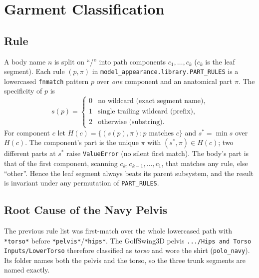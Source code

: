 \section{Garment Classification}
\label{sec:garment-classification}

\subsection{Rule}
A body name $n$ is split on ``/'' into path components $c_1, \dots, c_k$
($c_k$ is the leaf segment). Each rule $(p, \pi)$ in
\texttt{model\_appearance.library.PART\_RULES} is a lowercased \texttt{fnmatch}
pattern $p$ over \emph{one} component and an anatomical part $\pi$. The
specificity of $p$ is
\[
  s(p) = \begin{cases}
    0 & \text{no wildcard (exact segment name)},\\
    1 & \text{single trailing wildcard (prefix)},\\
    2 & \text{otherwise (substring)}.
  \end{cases}
\]
For component $c$ let $H(c) = \{(s(p), \pi) : p \text{ matches } c\}$ and
$s^\ast = \min s$ over $H(c)$. The component's part is the unique $\pi$ with
$(s^\ast, \pi) \in H(c)$; two different parts at $s^\ast$ raise
\texttt{ValueError} (no silent first match). The body's part is that of the
first component, scanning $c_k, c_{k-1}, \dots, c_1$, that matches any rule,
else ``other''. Hence the leaf segment always beats its parent subsystem, and
the result is invariant under any permutation of \texttt{PART\_RULES}.

\subsection{Root Cause of the Navy Pelvis}
The previous rule list was first-match over the whole lowercased path with
\texttt{*torso*} before \texttt{*pelvis*}/\texttt{*hips*}. The GolfSwing3D
pelvis \texttt{.../Hips and Torso Inputs/LowerTorso} therefore classified as
\emph{torso} and wore the shirt (\texttt{polo\_navy}). Its folder names both
the pelvis and the torso, so the three trunk segments are named exactly.

